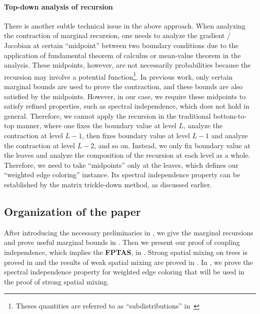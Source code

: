 \documentclass[a4paper,11pt]{article}
\begin{document}
\paragraph{Top-down analysis of recursion}

There is another subtle technical issue in the above approach. When analyzing the contraction of marginal recursion, one needs to analyze the gradient / Jacobian at certain ``midpoint'' between two boundary conditions due to the application of fundamental theorem of calculus or mean-value theorem in the analysis. These midpoints, however, are not necessarily probabilities because the recursion may involve a potential function\footnote{Theses quantities are referred to as ``subdistributions'' in~\cite{CLMM23}}. In previous work, only certain marginal bounds are used to prove the contraction, and these bounds are also satisfied by the midpoints. However, in our case, we require these midpoints to satisfy refined properties, such as spectral independence, which does not hold in general. Therefore, we cannot apply the recursion in the traditional bottom-to-top manner, where one fixes the boundary value at level $L$, analyze the contraction at level $L-1$, then fixes boundary value at level $L-1$ and analyze the contraction at level $L-2$, and so on. Instead, we only fix boundary value at the leaves and analyze the composition of the recursion at each level as a whole. Therefore, we need to take ``midpoints'' only at the leaves, which defines our ``weighted edge coloring'' instance. Its spectral independence property can be established by the matrix trickle-down method, as discussed earlier.


\subsection{Organization of the paper}

After introducing the necessary preliminaries in , we give the marginal recursions and prove useful marginal bounds in . Then we present our proof of coupling independence, which implies the \textbf{FPTAS}, in . Strong spatial mixing on trees is proved in  and the results of weak spatial mixing are proved in . In , we prove the spectral independence property for weighted edge coloring that will be used in the proof of strong spatial mixing.

 \newcommand{\dist}{\-{dist}}
\end{document}
